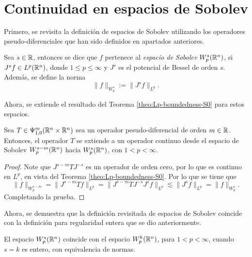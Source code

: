 \section{Continuidad en espacios de Sobolev}
Primero, se revisita la definición de espacios de Sobolev utilizando los operadores pseudo-diferenciales que han sido definidos en apartados anteriores.
\begin{definition}
	Sea $s\in\mathbb{R}$, entonces se dice que $f$ pertenece al \textit{espacio de Sobolev} $W^s_p(\mathbb{R}^n)$, si $J^sf\in L^p(\mathbb{R}^n)$, donde $1\leq p\leq\infty$ y $J^s$ es el potencial de Bessel de orden $s$. Además, se define la norma
	\begin{equation*}
		\|f\|_{W^s_p} := \|J^sf\|_{L^p}.
	\end{equation*} 
\end{definition}
Ahora, se extiende el resultado del Teorema \ref{theo:Lp-boundedness-S0} para estos espacios. 
\begin{theorem}\label{theo:Sobolev-S0}
	Sea $T\in\Psi^m_{1,0}(\mathbb{R}^n\times\mathbb{R}^n)$ sea un operador pesudo-diferencial de orden $m\in\mathbb{R}$. Entonces, el operador $T$ se extiende a un operador continuo desde el espacio de Sobolev $W^{s-m}_p(\mathbb{R}^n)$ hacia $W^s_p(\mathbb{R}^n)$, con $1<p<\infty$.
\end{theorem}
\begin{proof}
	Note que $J^{s-m}TJ^{-s}$ es un operador de orden cero, por lo que es continuo en $L^p$, en vista del Teorema \ref{theo:Lp-boundedness-S0}. Por lo que se tiene que 
	\begin{equation*}
		\|f\|_{W^{s-m}_p} = \|J^{s-m}Tf\|_{L^p} = \|J^{s-m}TJ^{-s}J^sf\|_{L^p} \lesssim \|J^sf\|_{L^p} = \|f\|_{W^s_p}.
	\end{equation*}
	Completando la prueba.
\end{proof}
Ahora, se demuestra que la definición revisitada de espacios de Sobolev coincide con la definición para regularidad entera que se dio anteriormente. 
\begin{theorem}
	El espacio $W^s_p(\mathbb{R}^n)$ coincide con el espacio $W^k_p(\mathbb{R}^n)$, para $1<p<\infty$, cuando $s=k$ es entero, con equivalencia de normas.
\end{theorem}
